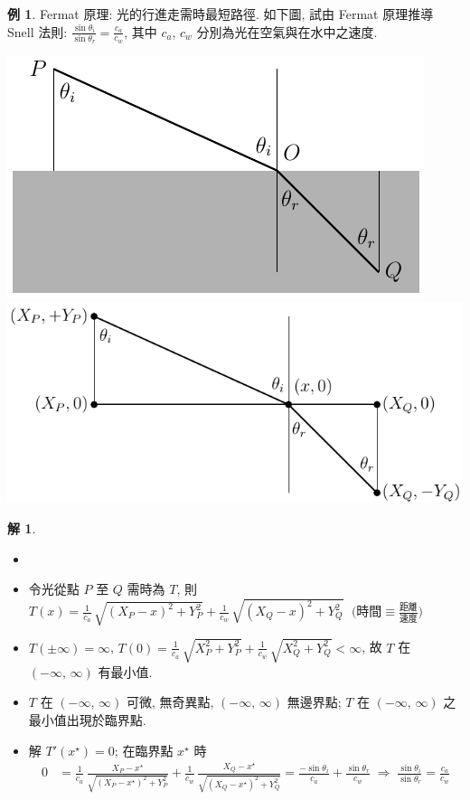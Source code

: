 \documentclass[12pt]{extarticle}
\newcommand{\ds}{\displaystyle}
\newcommand{\ie}{\;\Longrightarrow\;}
\theoremstyle{definition}
\newtheorem*{ex}{例}
\newtheorem*{sol}{解}
\begin{document}
\begin{ex}
  Fermat 原理: 光的行進走需時最短路徑. 如下圖, 試由 Fermat 原理推導 Snell 法則: $\ds\frac{\sin\theta_i}{\sin\theta_r} = \frac{c_a}{c_w}$, 其中 $c_a$, $c_w$ 分別為光在空氣與在水中之速度. 
  \begin{center}
    \includegraphics[scale=0.95,page=1]{fig/snell.pdf}
    \includegraphics[scale=0.95,page=1]{fig/snellB.pdf}
  \end{center}
\end{ex}

\begin{sol}
  \begin{itemize}\setlength\itemsep{0em}
    \item[]
    \item 令光從點 $P$ 至 $Q$ 需時為 $T$, 則 $\ds T(x) = \frac{1}{c_a}\,\sqrt{(X_P-x)^2+Y_P^2} + \frac{1}{c_w}\,\sqrt{(X_Q-x)^2+Y_Q^2}\;$ $\ds\Big(\text{時間}\equiv\frac{\text{距離}}{\text{速度}}\Big)$ 
    \item $\ds T(\pm\infty) = \infty$, $\ds T(0) = \frac{1}{c_a}\,\sqrt{X_P^2+Y_P^2} + \frac{1}{c_w}\,\sqrt{X_Q^2+Y_Q^2} < \infty$, 故 $T$ 在 $(-\infty,\,\infty)$ 有最小值. 
    \item $T$ 在 $(-\infty,\,\infty)$ 可微, 無奇異點, $(-\infty,\,\infty)$ 無邊界點; $T$ 在 $(-\infty,\,\infty)$ 之最小值出現於臨界點.  
    \item 解 $\ds T'(x^\star) = 0$; 在臨界點 $\ds x^\star$ 時
      \begin{align*}
        0 &= \frac{1}{c_a}\,\frac{X_P-x^\star}{\sqrt{(X_P-x^\star)^2+Y_P^2}} + \frac{1}{c_w}\,\frac{X_Q-x^\star}{\sqrt{(X_Q-x^\star)^2+Y_Q^2}} = \frac{-\sin\theta_i}{c_a} + \frac{\sin\theta_r}{c_w}\ie\frac{\sin\theta_i}{\sin\theta_r} = \frac{c_a}{c_w}
      \end{align*}
  \end{itemize}
\end{sol}
\end{document}
